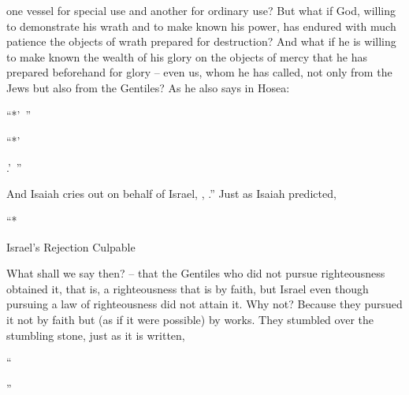 {one vessel
for
special use
and
another for
ordinary use?
But
what if
God,
willing
to demonstrate
his wrath
and
to make known
his
power,
has endured
with
much
patience
the objects
of wrath
prepared
for
destruction?
And what if he is willing to make known
the wealth
of his
glory
on
the objects
of mercy
that
he has prepared beforehand
for
glory –
even
us,
whom
he has called,
not
only
from
the Jews
but
also
from
the Gentiles?
As
he also says in
Hosea:
\par }{\Q “{}*’ ”
\par }{\Q {}“{}*’
\par }{.’ ”
\par }{\PP {}And
Isaiah
cries out
on behalf of
Israel,
{},
.”
Just as
Isaiah
predicted,
\par }{\Q “{}*
\par }{
\par }{
\par }{\SH Israel’s Rejection Culpable
\par }{\PP {}What
shall we say then? – that the Gentiles who did not pursue righteousness obtained it, that is, a righteousness that is by faith,
but
Israel
even though pursuing
a law
of righteousness
did
not
attain
it.
Why
not? Because
they pursued it not
by
faith
but
(as
if it were possible) by
works.
They stumbled over
the stumbling
stone,
just as
it is written,
\par }{\Q “{}
\par }{
\par }{”


}
